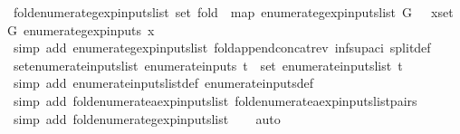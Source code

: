 \begin{isabellebody}
\isanewline
%
\endisadelimproof
\isanewline
{}\isamarkupfalse%
\ fold{\isacharunderscore}enumerate{\isacharunderscore}gexp{\isacharunderscore}inputs{\isacharunderscore}list{\isacharcolon}\ {\isachardoublequoteopen}set\ {\isacharparenleft}fold\ {\isacharparenleft}{\isacharat}{\isacharparenright}\ {\isacharparenleft}map\ enumerate{\isacharunderscore}gexp{\isacharunderscore}inputs{\isacharunderscore}list\ G{\isacharparenright}\ {\isacharbrackleft}{\isacharbrackright}{\isacharparenright}\ {\isacharequal}\ {\isacharparenleft}{\isasymUnion}x{\isasymin}set\ G{\isachardot}\ enumerate{\isacharunderscore}gexp{\isacharunderscore}inputs\ x{\isacharparenright}{\isachardoublequoteclose}\isanewline
%
\isadelimproof
\ \ \ \ %
\endisadelimproof
%
\isatagproof
{}\isamarkupfalse%
\ {\isacharparenleft}simp\ add{\isacharcolon}\ enumerate{\isacharunderscore}gexp{\isacharunderscore}inputs{\isacharunderscore}list\ fold{\isacharunderscore}append{\isacharunderscore}concat{\isacharunderscore}rev\ inf{\isacharunderscore}sup{\isacharunderscore}aci{\isacharparenleft}{}{\isacharparenright}\ split{\isacharunderscore}def{\isacharparenright}%
\endisatagproof
{\isafoldproof}%
%
\isadelimproof
\isanewline
%
\endisadelimproof
\isanewline
{}\isamarkupfalse%
\ set{\isacharunderscore}enumerate{\isacharunderscore}inputs{\isacharunderscore}list{\isacharcolon}\ {\isachardoublequoteopen}enumerate{\isacharunderscore}inputs\ t\ {\isacharequal}\ set\ {\isacharparenleft}enumerate{\isacharunderscore}inputs{\isacharunderscore}list\ t{\isacharparenright}{\isachardoublequoteclose}\isanewline
%
\isadelimproof
\ \ %
\endisadelimproof
%
\isatagproof
{}\isamarkupfalse%
\ {\isacharparenleft}simp\ add{\isacharcolon}\ enumerate{\isacharunderscore}inputs{\isacharunderscore}list{\isacharunderscore}def\ enumerate{\isacharunderscore}inputs{\isacharunderscore}def{\isacharparenright}\isanewline
\ \ \isamarkupfalse%
\ {\isacharparenleft}simp\ add{\isacharcolon}\ fold{\isacharunderscore}enumerate{\isacharunderscore}aexp{\isacharunderscore}inputs{\isacharunderscore}list\ fold{\isacharunderscore}enumerate{\isacharunderscore}aexp{\isacharunderscore}inputs{\isacharunderscore}list{\isacharunderscore}pairs{\isacharparenright}\isanewline
\ \ \isamarkupfalse%
\ {\isacharparenleft}simp\ add{\isacharcolon}\ fold{\isacharunderscore}enumerate{\isacharunderscore}gexp{\isacharunderscore}inputs{\isacharunderscore}list{\isacharparenright}\isanewline
\ \ \isamarkupfalse%
\ auto%
\endisatagproof
{\isafoldproof}%
%
\isadelimproof

\end{isabellebody}
